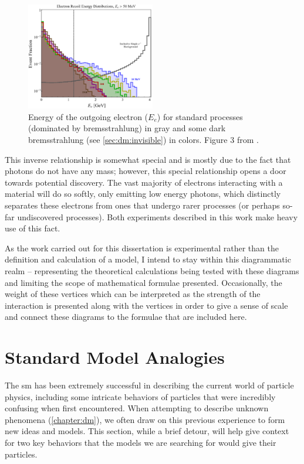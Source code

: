 \begin{figure}
  \centering
  \includegraphics[width=0.5\textwidth]{figures/intro/photon-reject-fig-3-recoil-electron-energy.png}
  \caption{
    Energy of the outgoing electron ($E_e$) for standard processes (dominated by bremsstrahlung)
    in gray and some dark bremsstrahlung (see \cref{sec:dm:invisible}) in colors.
    Figure 3 from \cite{ldmx-photon-reject-2020}.
  }
  \label{fig:recoil-electron-energy}
\end{figure}

This inverse relationship is somewhat special and is mostly due to the fact that photons do not
have any mass; however, this special relationship opens a door towards potential discovery. The
vast majority of electrons interacting with a material will do so softly, only emitting low energy
photons, which distinctly separates these electrons from ones that undergo rarer processes (or
perhaps so-far undiscovered processes). Both experiments described in this work make heavy use of
this fact.

As the work carried out for this dissertation is experimental rather than the definition and
calculation of a model, I intend to stay within this diagrammatic realm -- representing the
theoretical calculations being tested with these diagrams and limiting the scope of mathematical
formulae presented. Occasionally, the weight of these vertices which can be interpreted as the
strength of the interaction is presented along with the vertices in order to give a sense of scale
and connect these diagrams to the formulae that are included here.

\section{Standard Model Analogies}
The \ac{sm} has been extremely successful in describing the current world of particle physics,
including some intricate behaviors of particles that were incredibly confusing when first
encountered. When attempting to describe unknown phenomena (\cref{chapter:dm}), we often draw on
this previous experience to form new ideas and models. This section, while a brief detour, will
help give context for two key behaviors that the models we are searching for would give their
particles.

